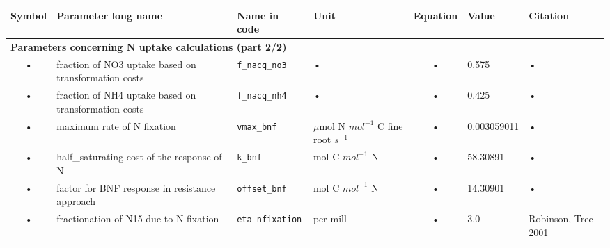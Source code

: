 \begin{table}
\begin{tabularx}{\linewidth}{|c|X|l|l|c|l|X|} %
\hline 
Symbol & Parameter long name & Name in code & Unit & Equation & Value & Citation \\ 
\hline 

\multicolumn{6}{l}{\bf Parameters concerning N uptake calculations (part 2/2)}\\
\hline
• & fraction of NO3 uptake based on transformation costs & \texttt{f\_nacq\_no3} & • & • & 0.575 & • \\
• & fraction of NH4 uptake based on transformation costs & \texttt{f\_nacq\_nh4} & • & • & 0.425 & • \\
• & maximum rate of N fixation & \texttt{vmax\_bnf} & $\mu$mol N $mol^{-1}$ C fine root $s^{-1}$ & • & 0.003059011 & • \\
• & half\_saturating cost of the response of N & \texttt{k\_bnf} & mol C $mol^{-1}$ N & • & 58.30891 & • \\
• & factor for BNF response in resistance approach & \texttt{offset\_bnf} & mol C $mol^{-1}$ N & • & 14.30901 & • \\
• & fractionation of N15 due to N fixation & \texttt{eta\_nfixation} & per mill & • & 3.0 & Robinson, Tree 2001 \\
\hline 
\end{tabularx}
\end{table}


